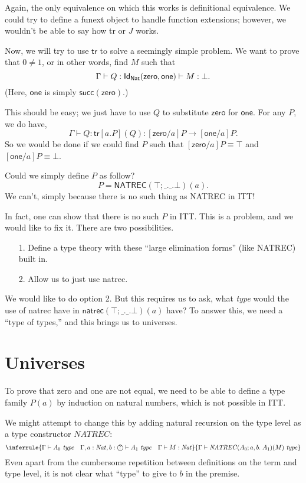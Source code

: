 \documentclass{article} \usepackage{chtt-notes} \usepackage{stmaryrd}
\newcommand{\entails}{\vdash}
\newcommand{\G}{\Gamma}
\newcommand{\atype}[1]{#1~\mathit{type}}
\newcommand{\Nat}{\mathit{Nat}}
\newcommand{\circled}[1]{\text{\textcircled{#1}}}
\newcommand{\tr}{\textsf{tr}}
\newcommand{\one}{\textsf{one}}
\newcommand{\zero}{\textsf{zero}}
\begin{document}
Again, the only equivalence on which this works is definitional equivalence.
We could try to define a \textsf{funext} object to handle function extensions; however,
we wouldn't be able to say how \textsf{tr} or $J$ works.

Now, we will try to use $\tr$ to solve a seemingly simple problem. We want to prove that
$0 \ne 1$, or in other words, find $M$ such that
\[
  \G \entails Q : \Id{\textsf{Nat}}{\zero}{\one} \entails M : \bot.
\]
(Here, $\one$ is simply $\textsf{succ}(\zero)$.)

This should be easy; we just have to use $Q$ to substitute $\zero$ for $\one$.
For any $P$, we do have,
\[
  \G \entails Q : \tr[a.P](Q) : [\zero / a]P \to [\one / a]P.
\]
So we would be done if we could find $P$ such that $[\zero / a]P \equiv \top$ and $[\one / a]P \equiv \bot$.

Could we simply define $P$ as follow?
\[ 
  P = \textsf{NATREC}(\top; \_.\_. \bot)(a).
\]
We can't, simply because there is no such thing as \textsf{NATREC} in ITT!

In fact, one can show that there is no such $P$ in ITT. This is a problem, and we would like
to fix it. There are two possibilities.
\begin{enumerate}
\item[1.] Define a type theory with these ``large elimination forms'' (like \textsf{NATREC}) built in.
\item[2.] Allow us to just use \textsf{natrec}.
\end{enumerate}

We would like to do option 2. But this requires us to ask, what \emph{type} would the
use of \textsf{natrec} have in
$\textsf{natrec}(\top; \_.\_. \bot)(a)$ have? To answer this, we need a ``type of types,''
and this brings us to universes.
  
\section{Universes}%
%
To prove that zero and one are not equal, we need to be able to define a type family $P(a)$ by induction on natural numbers, which is not possible in ITT.

We might attempt to change this by adding natural recursion on the type level as a type constructor $\mathit{NATREC}$:
\[ \inferrule{\G \entails \atype{A_0} \quad \G, a: \Nat, b: \circled{?} \entails \atype{A_1} \quad \G \entails M : \Nat}{\G \entails \atype{\mathit{NATREC}(A_0; a,b.\; A_1)(M)}} \]
Even apart from the cumbersome repetition between definitions on the term and type level, it is not clear what ``type'' to give to $b$ in the premise.
\end{document}
